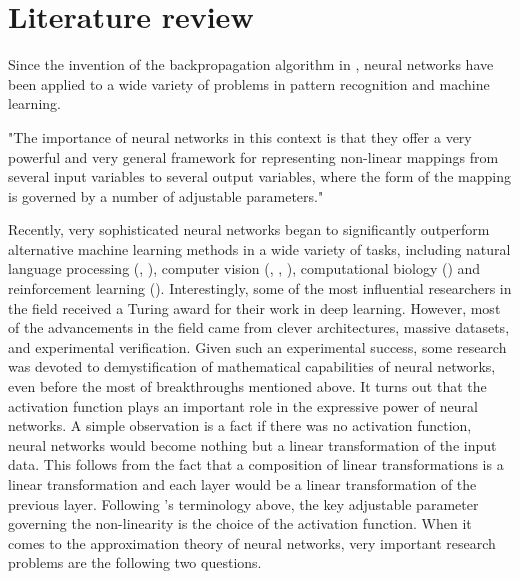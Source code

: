 \chapter{Literature review}
\label{chapter:literature-review}

Since the invention of the backpropagation algorithm in  \cite{rumelhart_1986_learning}, neural networks have been applied to a wide variety of problems in pattern recognition and machine learning.

\begin{displayquote}
"The importance of neural networks in this context is that they offer a very powerful and very general framework for representing non-linear mappings from several input variables to several output variables, where the form of the mapping is governed by a number of adjustable parameters."
\end{displayquote}
Recently, very sophisticated neural networks began to significantly outperform alternative machine learning methods in a wide variety of tasks, including natural language processing (\cite{vaswani_2017_attention}, \cite{brown_2020_language}), computer vision (\cite{szegedy_2014_going}, \cite{he_2015_deep}, \cite{bochkovskiy_2020_yolov4}), computational biology (\cite{senior_2020_improved}) and reinforcement learning (\cite{silver_2017_mastering}). Interestingly, some of the most influential researchers in the field received a Turing award for their work in deep learning. However, most of the advancements in the field came from clever architectures, massive datasets, and experimental verification.  Given such an experimental success, some research was devoted to demystification of mathematical capabilities of neural networks, even before the most of breakthroughs mentioned above.
It turns out that the activation function plays an important role in the expressive power of neural networks. A simple observation is a fact if there was no activation function, neural networks would become nothing but a linear transformation of the input data. This follows from the fact that a composition of linear transformations is a linear transformation and each layer would be a linear transformation of the previous layer.
Following \cite{bishop_1998_neural}'s terminology above, the key adjustable parameter governing the non-linearity is the choice of the activation function.
When it comes to the approximation theory of neural networks, very important research problems are the following two questions.
